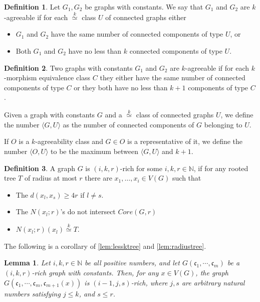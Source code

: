 \documentclass[11pt,notitlepage,a4paper]{article}
\newtheorem{lemma}{Lemma}[section]
\theoremstyle{definition}
\newtheorem{definition}{Definition}[section]
\newcommand{\cc}{\mathfrak{c}}
\newcommand{\N}{\mathbb{N}}
\newcommand{\clist}{\mathfrak{c}_{1}, \cdots, \mathfrak{c}_m}
\newcommand{\morph}[1]{\stackrel{#1}{\simeq}}
\begin{document}
\begin{definition}
	Let $G_1,G_2$ be graphs with constants. We say that $G_1$ and $G_2$ are
	$k$-agreeable if for each $\morph{k}$ class $U$ of connected graphs either
	\begin{itemize}
		\item $G_1$ and $G_2$ have the same number of connected components of type $U$, or
		\item Both $G_1$ and $G_2$ have no less than $k$ connected components of type $U$.
	\end{itemize} 
\end{definition}


\begin{definition} 
	Two graphs with constants $G_1$ and $G_2$ are $k$-agreeable if for each $k$-morphism 
	equivalence class $C$ they either have the same number of connected components of type
	$C$ or they both have no less than $k+1$ components of type $C$. 
\end{definition}

Given a graph with constants $G$ and a $\morph{k}$ class of connected
graphs $U$, we define the number $\langle G, U \rangle$ as the number
of connected components of $G$ belonging to $U$. \par
If $O$ is a $k$-agreeability class and $G\in O$ is a
representative of it, we define the number $\langle O, U \rangle$ to
be the maximum between $\langle G,U \rangle$ and $k+1$.

\begin{definition}
	A graph $G$ is $(i,k,r)$-rich for some $i,k,r\in \N$, if for any rooted tree $T$
	of radius at most $r$ there are $x_1,\dots,x_i\in V(G)$ such that
	\begin{itemize}
		\item The $d(x_l,x_s)\geq 4r$ if $l\neq s$.
		\item The $N(x_l;r)$'s do not intersect $Core(G,r)$
		\item $N(x_l;r)(x_l) \morph{k} T$.		
	\end{itemize} 
\end{definition}

The following is a corollary of \cref{lem:lessktree} and \cref{lem:radiustree}.

\begin{lemma} \label{lemm:rich}
	Let $i,k,r\in \N$ be all positive numbers, and let $G(\clist)$
	be a $(i,k,r)$-rich graph with constants. Then, for any $x\in V(G)$,
	the graph \\$G(\clist, \cc_{m+1}(x))$ is $(i-1,j,s)$-rich, 
	where $j,s$ are arbitrary natural numbers satisfying $j\leq k$,
	and $s\leq r$.
\end{lemma}
\end{document}
